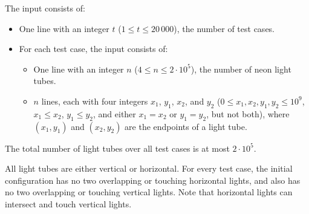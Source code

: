 
    The input consists of:
    \begin{itemize}
        \item One line with an integer $t$ ($1 \leq t \leq 20\,000$), the number of test cases.
        \item For each test case, the input consists of:
        \begin{itemize}
            \item One line with an integer $n$ ($4 \leq n \leq 2 \cdot 10^5$), the number of neon light tubes.
            \item $n$ lines, each with four integers $x_1$, $y_1$, $x_2$, and $y_2$
                ($0 \leq x_1, x_2, y_1, y_2 \leq 10^9$, $x_1 \leq x_2$,
    $y_1 \leq y_2$, and either $x_1=x_2$ or $y_1=y_2$, but not both),
            where $(x_1, y_1)$ and $(x_2, y_2)$ are the endpoints of a light tube.
        \end{itemize}
    \end{itemize}

    The total number of light tubes over all test cases is at most $2 \cdot 10^5$.

    All light tubes are either vertical or horizontal.
    For every test case, the initial configuration has no two overlapping or touching horizontal lights,
    and also has no two overlapping or touching vertical lights.
    Note that horizontal lights can intersect and touch vertical lights.


